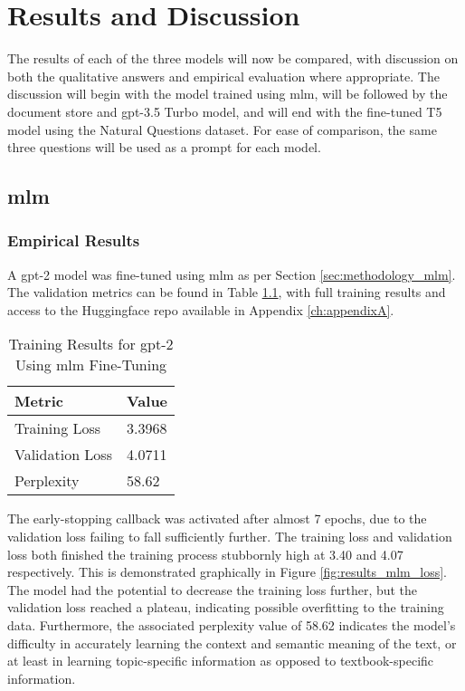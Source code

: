\chapter{Results and Discussion}\label{ch:results}
The results of each of the three models will now be compared, with discussion on both the qualitative answers and empirical evaluation where appropriate. The discussion will begin with the model trained using \acrfull{mlm}, will be followed by the document store and \acrshort{gpt}-3.5 Turbo model, and will end with the fine-tuned T5 model using the Natural Questions dataset. For ease of comparison, the same three questions will be used as a prompt for each model.


\section{\acrlong{mlm}}\label{sec:results_mlm}
\subsection{Empirical Results}
A \acrshort{gpt}-2 model was fine-tuned using \acrlong{mlm} as per Section \ref{sec:methodology_mlm}. The validation metrics can be found in Table \ref{tab:results_mlm}, with full training results and access to the Huggingface repo available in Appendix \ref{ch:appendixA}.

\begin{table}[ht!]
    \centering
    \caption{Training Results for \acrshort{gpt}-2 Using \acrshort{mlm} Fine-Tuning}
    \begin{tabular}{l|l}
        \textbf{Metric} & \textbf{Value} \\ \hline
        Training Loss & 3.3968 \\ \hline
        Validation Loss & 4.0711 \\ \hline
        Perplexity & 58.62 \\
    \end{tabular}
    \label{tab:results_mlm}
\end{table}

The early-stopping callback was activated after almost 7 epochs, due to the validation loss failing to fall sufficiently further. The training loss and validation loss both finished the training process stubbornly high at 3.40 and 4.07 respectively. This is demonstrated graphically in Figure \ref{fig:results_mlm_loss}. The model had the potential to decrease the training loss further, but the validation loss reached a plateau, indicating possible overfitting to the training data. Furthermore, the associated perplexity value of 58.62 indicates the model's difficulty in accurately learning the context and semantic meaning of the text, or at least in learning topic-specific information as opposed to textbook-specific information.

